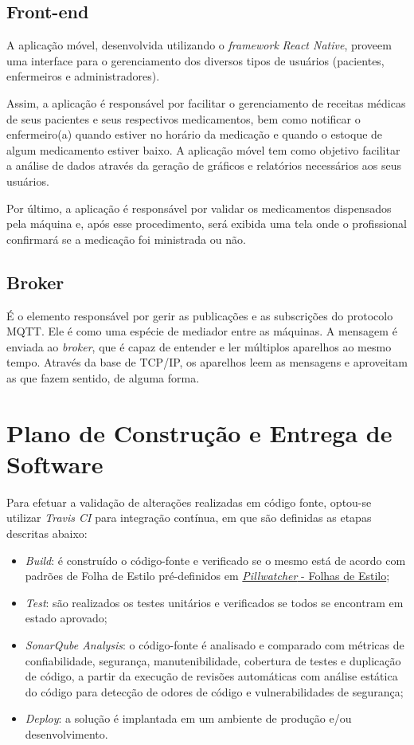 \subsection{Front-end}
A aplicação móvel, desenvolvida utilizando o \emph{framework} \textit{React Native}, proveem uma interface para o gerenciamento dos diversos tipos de usuários (pacientes, enfermeiros e administradores). 

Assim, a aplicação é responsável por facilitar o gerenciamento de receitas médicas de seus pacientes e seus respectivos medicamentos, bem como notificar o enfermeiro(a) quando estiver no horário da medicação e quando o estoque de algum medicamento estiver baixo. A aplicação móvel tem como objetivo facilitar a análise de dados através da geração de gráficos e relatórios necessários aos seus usuários. 

Por último, a aplicação é responsável por validar os medicamentos dispensados pela máquina e, após esse procedimento, será exibida uma tela onde o profissional confirmará se a medicação foi ministrada ou não.

\subsection{Broker}

É o elemento responsável por gerir as publicações e as subscrições do protocolo MQTT. Ele é como uma espécie de mediador entre as máquinas. A mensagem é enviada ao \textit{broker}, que é capaz de entender e ler múltiplos aparelhos ao mesmo tempo. Através da base de TCP/IP, os aparelhos leem as mensagens e aproveitam as que fazem sentido, de alguma forma.

\section{Plano de Construção e Entrega de Software}
Para efetuar a validação de alterações realizadas em código fonte, optou-se utilizar \textit{Travis CI} para integração contínua, em que são definidas as etapas descritas abaixo:

\begin{itemize}
    \item \emph{Build}: é construído o código-fonte e verificado se o mesmo está de acordo com padrões de Folha de Estilo pré-definidos em \href{https://github.com/PillWatcher/Documentacao/wiki/Folha-de-Estilo}{\emph{Pillwatcher} - Folhas de Estilo};
    \item  \emph{Test}: são realizados os testes unitários e verificados se todos se encontram em estado aprovado;
    \item  \emph{SonarQube Analysis}: o código-fonte é analisado e comparado com métricas de confiabilidade, segurança, manutenibilidade, cobertura de testes e duplicação de código, a partir da execução de revisões automáticas com análise estática do código para detecção de odores de código e vulnerabilidades de segurança;
    \item  \emph{Deploy}: a solução é implantada em um ambiente de produção e/ou desenvolvimento. 
\end{itemize}

